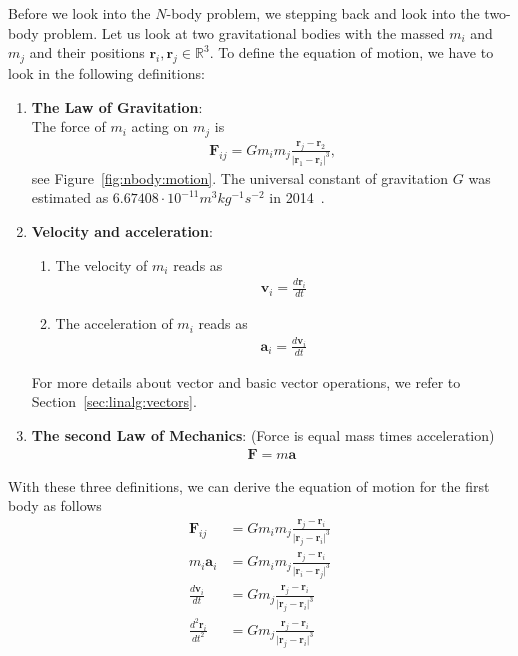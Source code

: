Before we look into the $N$-body problem, we stepping back and look into the two-body problem. Let us look at two gravitational bodies with the massed $m_i$ and $m_j$ and their positions $\mathbf{r}_i,\mathbf{r}_j\in\mathbb{R}^3$. To define the equation of motion, we have to look in the following definitions:
\vspace{0.25cm}
\begin{enumerate}
\item \textbf{The Law of Gravitation}: \\
The force of $m_i$ acting on $m_j$ is 
\begin{align}
\mathbf{F}_{ij}= G m_i m_j \frac{\mathbf{r}_j-\mathbf{r}_2}{\vert \mathbf{r}_1-\mathbf{r}_i \vert^3}\text{,}
\end{align}
see Figure~\ref{fig:nbody:motion}. The universal constant of gravitation $G$ was estimated as $6.67408\cdot 10^{-11}m^3kg^{-1}s^{-2}$ in 2014~\cite{mohr2016codata}.
\item \textbf{Velocity and acceleration}: 
\begin{enumerate}
\item The velocity of $m_i$ reads as
\begin{align}
\mathbf{v}_i = \frac{d \mathbf{r}_i}{dt} \label{eq:nbody:vel}
\end{align}
\item The acceleration of $m_i$ reads as
\begin{align}
\mathbf{a}_i = \frac{d \mathbf{v}_i}{dt} \label{eq:nbody:acc}
\end{align}
\end{enumerate}
For more details about vector and basic vector operations, we refer to Section~\ref{sec:linalg:vectors}.
\item \textbf{The second Law of Mechanics}:  (Force is equal mass times acceleration) 
\begin{align}
\mathbf{F}= m \mathbf{a} \label{eq:law:first}
\end{align}
\end{enumerate}
With these three definitions, we can derive the equation of motion for the first body as follows
\begin{align}
\mathbf{F}_{ij}&=G m_i m_j \frac{\mathbf{r}_j-\mathbf{r}_i}{\vert \mathbf{r}_j-\mathbf{r}_i \vert^3} \label{eq:nbody:motion1} \\
m_i \mathbf{a}_i &= G m_i m_j \frac{\mathbf{r}_j-\mathbf{r}_i}{\vert \mathbf{r}_i-\mathbf{r}_j \vert^3} \label{eq:nbody:motion2} \\
\frac{d \mathbf{v}_i}{dt} & = G m_j \frac{\mathbf{r}_j-\mathbf{r}_i}{\vert \mathbf{r}_j-\mathbf{r}_i \vert^3} \label{eq:nbody:motion3} \\
\frac{d^2 \mathbf{r}_i}{dt^2} & = G m_j \frac{\mathbf{r}_j-\mathbf{r}_i}{\vert \mathbf{r}_j-\mathbf{r}_i \vert^3}
\label{eq:nbody:motion4}
\end{align}
